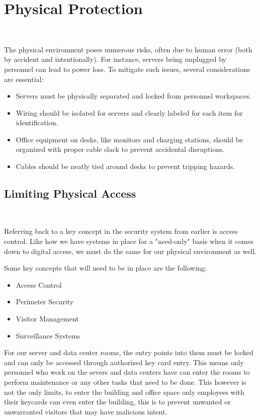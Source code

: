 \documentclass[12pt,a4paper]{report}
\begin{document}
\section{Physical Protection}
\

The physical environment poses numerous risks, often due to human error (both by accident and intentionally). 
For instance, servers being unplugged by personnel can lead to power loss.
To mitigate such issues, several considerations are essential:
\begin{itemize}
 \item Servers must be physically separated and locked from personnel workspaces.
 \item Wiring should be isolated for servers and clearly labeled for each item for identification.
 \item Office equipment on desks, like monitors and charging stations, should be organized with proper cable slack to prevent accidental disruptions.
 \item Cables should be neatly tied around desks to prevent tripping hazards.
\end{itemize}

\subsection{Limiting Physical Access}
\

Referring back to a key concept in the security system from earlier is access control.
Like how we have systems in place for a "need-only" basis when it comes down to digital access, we must do the same for our physical environment as well.

\pagebreak %

\noindent
Some key concepts that will need to be in place are the following:
\begin{itemize}
 \item Access Control
 \item Perimeter Security
 \item Visitor Management
 \item Surveillance Systems
\end{itemize}

For our server and data center rooms, the entry points into them must be locked and can only be accessed through authorized key card entry.
This means only personnel who work on the severs and data centers have can enter the rooms to perform maintenance or any other tasks that need to be done.
This however is not the only limits, to enter the building and office space only employees with their keycards can even enter the building, this is to prevent unwanted or unwarranted visitors that may have malicious intent.
\end{document}
